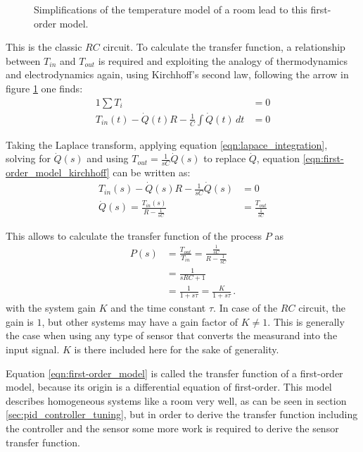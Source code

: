 \begin{figure}[hb]
    \centering
    \caption{Simplifications of the temperature model of a room lead to this first-order model.}
    \label{fig:first-order_model}
\end{figure}

This is the classic $RC$ circuit. To calculate the transfer function, a relationship between $T_{in}$ and $T_{out}$ is required and exploiting the analogy of thermodynamics and electrodynamics again, using Kirchhoff's second law, following the arrow in figure \ref{fig:first-order_model} one finds:
\begin{alignat}{1}
    \sum T_i &= 0 \nonumber\\
    T_{in}(t) - \dot{Q}(t) R - \frac 1 C \int \dot{Q}(t)\,dt &= 0 \label{eqn:first-order_model_kirchhoff}
\end{alignat}

Taking the Laplace transform, applying equation \ref{eqn:lapace_integration}, solving for $ \dot Q(s)$ and using $T_{out} = \frac{1}{sC} \dot Q(s)$ to replace $\dot Q$, equation \ref{eqn:first-order_model_kirchhoff} can be written as:
\begin{align*}
    T_{in}(s) - \dot{Q}(s) R - \frac{1}{sC} \dot{Q}(s) &= 0\\
    \dot{Q}(s) = \frac{T_{in}(s)}{R-\frac{1}{sC}} &= \frac{T_{out}}{\frac{1}{sC}}
\end{align*}

This allows to calculate the transfer function of the process $P$ as
\begin{align}
    P(s) &= \frac{T_{out}}{T_{in}} = \frac{\frac{1}{sC}}{R-\frac{1}{sC}} \nonumber\\
    &= \frac{1}{sRC + 1} \nonumber\\
    &= \frac{1}{1 + s\tau} = \frac{K}{1 + s\tau}\,. \label{eqn:first-order_model}
\end{align}
with the system gain $K$ and the time constant $\tau$. In case of the $RC$ circuit, the gain is $1$, but other systems may have a gain factor of $K \neq 1$. This is generally the case when using any type of sensor that converts the measurand into the input signal. $K$ is there included here for the sake of generality.

Equation \ref{eqn:first-order_model} is called the transfer function of a first-order model, because its origin is a differential equation of first-order. This model describes homogeneous systems like a room very well, as can be seen in section \ref{sec:pid_controller_tuning}, but in order to derive the transfer function including the controller and the sensor some more work is required to derive the sensor transfer function.

